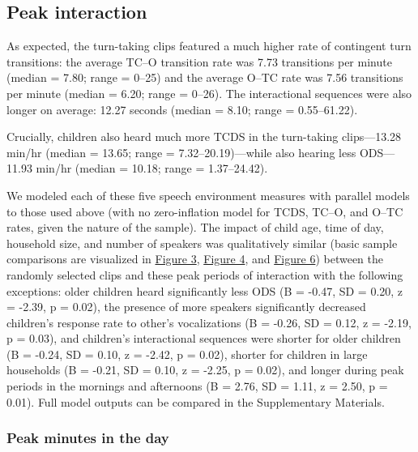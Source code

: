 \documentclass[floatsintext,man]{apa6}
\theoremstyle{definition}
\theoremstyle{definition}
\theoremstyle{definition}
\theoremstyle{remark}
\begin{document}
\subsection{Peak interaction}\label{peak-interaction}

As expected, the turn-taking clips featured a much higher rate of
contingent turn transitions: the average TC--O transition rate was 7.73
transitions per minute (median = 7.80; range = 0--25) and the average
O--TC rate was 7.56 transitions per minute (median = 6.20; range =
0--26). The interactional sequences were also longer on average: 12.27
seconds (median = 8.10; range = 0.55--61.22).

Crucially, children also heard much more TCDS in the turn-taking
clips---13.28 min/hr (median = 13.65; range = 7.32--20.19)---while also
hearing less ODS---11.93 min/hr (median = 10.18; range = 1.37--24.42).

We modeled each of these five speech environment measures with parallel
models to those used above (with no zero-inflation model for TCDS,
TC--O, and O--TC rates, given the nature of the sample). The impact of
child age, time of day, household size, and number of speakers was
qualitatively similar (basic sample comparisons are visualized in
\protect\hyperlink{fig3}{Figure 3}, \protect\hyperlink{fig4}{Figure 4},
and \protect\hyperlink{fig6}{Figure 6}) between the randomly selected
clips and these peak periods of interaction with the following
exceptions: older children heard significantly less ODS (B = -0.47, SD =
0.20, z = -2.39, p = 0.02), the presence of more speakers significantly
decreased children's response rate to other's vocalizations (B = -0.26,
SD = 0.12, z = -2.19, p = 0.03), and children's interactional sequences
were shorter for older children (B = -0.24, SD = 0.10, z = -2.42, p =
0.02), shorter for children in large households (B = -0.21, SD = 0.10, z
= -2.25, p = 0.02), and longer during peak periods in the mornings and
afternoons (B = 2.76, SD = 1.11, z = 2.50, p = 0.01). Full model outputs
can be compared in the Supplementary Materials.

\subsubsection{Peak minutes in the day}\label{peak-minutes-in-the-day}
\end{document}
